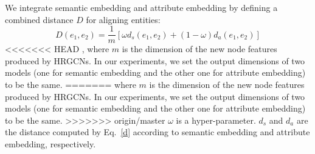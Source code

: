 	We integrate semantic embedding and attribute embedding by defining a combined distance $D$ for aligning entities:
	\begin{equation}
		D(e_1,e_2)=\frac{1}{m}[\omega d_s(e_1,e_2)+(1-\omega)d_a(e_1,e_2)]
	\end{equation}
<<<<<<< HEAD
	, where $m$ is the dimension of the new node features produced by HRGCNs.
	In our experiments, we set the output dimensions of two models (one for semantic embedding and the other one for attribute embedding) to be the same.
=======
	where $m$ is the dimension of the new node features produced by HRGCNs.
	In our experiments, we set the output dimensions of two models (one for semantic embedding and the other one for attribute embedding) to be the same.
>>>>>>> origin/master
	$\omega$ is a hyper-parameter. $d_s$ and $d_a$ are the distance computed by Eq.~\ref{d} according to semantic embedding and attribute embedding, respectively.
	
